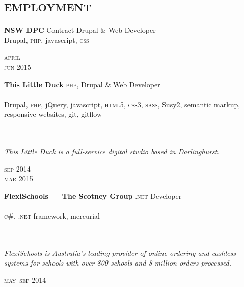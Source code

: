 
\vspace{-0.6cm}
\section*{\textsc{employment}}
\vspace{-0.2cm}

\begin{minipage}[t]{0.70\textwidth}
\textbf{NSW DPC}\phantom{..} Contract Drupal \& Web Developer \\
Drupal, \textsc{php}, javascript, \textsc{css}
\end{minipage}
\begin{minipage}[t]{0.30\textwidth}
{
\hfill \textsc{april}--\\ 
\hspace*{0pt} \hfill \textsc{jun} 2015
\par
}
\end{minipage}
\vspace{0.2in}

\begin{minipage}[t]{0.70\textwidth}
\textbf{This Little Duck}\phantom{..} \textsc{php}, Drupal \& Web Developer \\
\\
Drupal, \textsc{php}, jQuery, javascript, \textsc{html5}, 
\textsc{css3}, \textsc{sass}, Susy2, semantic markup, responsive websites,
git, gitflow
\\
\\
\\
{\small
\textit{This Little Duck is a full-service digital studio based in Darlinghurst.}
\par}
\end{minipage}
\begin{minipage}[t]{0.30\textwidth}
{
\hfill \textsc{sep} 2014--\\ 
\hspace*{0pt} \hfill \textsc{mar} 2015
\par
}
\end{minipage}

\vspace{0.2in}

\begin{minipage}[t]{0.7\textwidth}
\textbf{FlexiSchools --- The Scotney Group}\phantom{..} \textsc{.net} Developer \\
\\
\textsc{c\#}, \textsc{.net} framework, mercurial
\\
\\
\\
{\small
\textit{FlexiSchools is Australia’s leading provider of online ordering and cashless systems for schools with over 800 schools and 8 million orders processed. }
\par}
\end{minipage}
\begin{minipage}[t]{0.30\textwidth}
\hfill \textsc{may}--\textsc{sep} 2014\\
\end{minipage}

